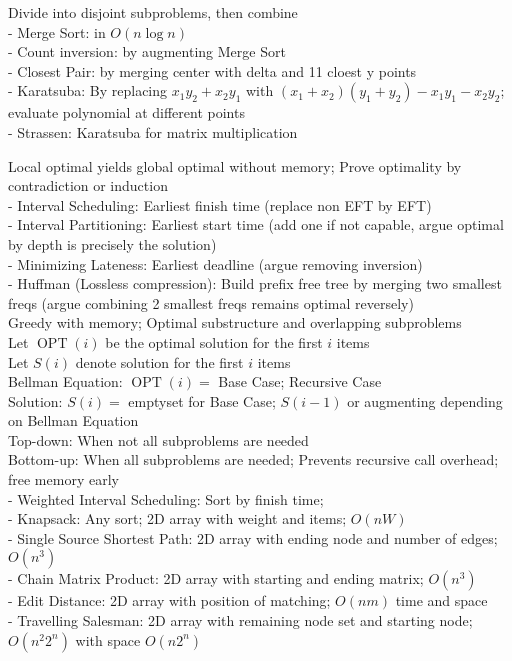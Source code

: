 \documentclass[10pt]{CheatSheet/hw}
\begin{document}
\begin{multicols*}{5}
 Divide into disjoint subproblems, then combine\\
- Merge Sort: in $O(n\log n)$\\
- Count inversion: by augmenting Merge Sort\\
- Closest Pair: by merging center with delta and 11 cloest y points\\
- Karatsuba: By replacing $x_1y_2+x_2y_1$ with $(x_1+x_2)(y_1+y_2)-x_1y_1-x_2y_2$; evaluate polynomial at different points\\
- Strassen: Karatsuba for matrix multiplication

 Local optimal yields global optimal without memory; Prove optimality by contradiction or induction\\
- Interval Scheduling: Earliest finish time (replace non EFT by EFT)\\
- Interval Partitioning: Earliest start time (add one if not capable, argue optimal by depth is precisely the solution)\\ 
- Minimizing Lateness: Earliest deadline (argue removing inversion)\\
- Huffman (Lossless compression): Build prefix free tree by merging two smallest freqs (argue combining 2 smallest freqs remains optimal reversely)\\ 

 Greedy with memory; Optimal substructure and overlapping subproblems\\
Let $\operatorname{OPT}(i)$ be the optimal solution for the first $i$ items\\
Let $S(i)$ denote solution for the first $i$ items\\
Bellman Equation: $\operatorname{OPT}(i)=$ Base Case; Recursive Case\\
Solution: $S(i)=$ emptyset for Base Case; $S(i-1)$ or augmenting depending on Bellman Equation\\
Top-down: When not all subproblems are needed\\
Bottom-up: When all subproblems are needed; Prevents recursive call overhead; free memory early\\
- Weighted Interval Scheduling: Sort by finish time;\\
- Knapsack: Any sort; 2D array with weight and items; $O(nW)$\\
- Single Source Shortest Path: 2D array with ending node and number of edges; $O(n^3)$\\
- Chain Matrix Product: 2D array with starting and ending matrix; $O(n^3)$\\
- Edit Distance: 2D array with position of matching; $O(nm)$ time and space\\
- Travelling Salesman: 2D array with remaining node set and starting node; $O(n^2 2^n)$ with space $O(n 2^n)$


\end{multicols*}
\end{document}
